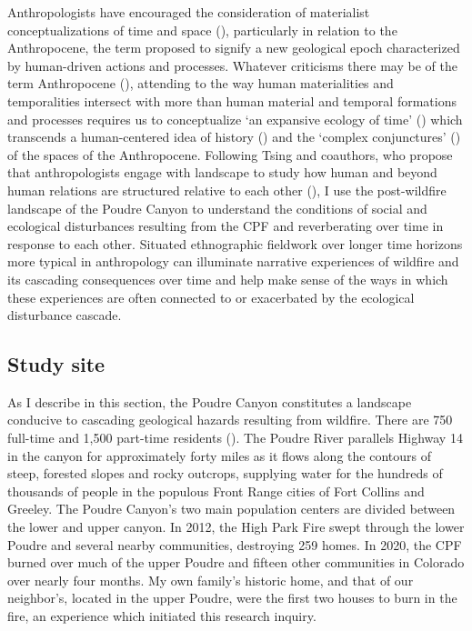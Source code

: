 \documentclass[
]{article}
\begin{document}
Anthropologists have encouraged the consideration of materialist conceptualizations of time and space (), particularly in relation to the Anthropocene, the term proposed to signify a new geological epoch characterized by human-driven actions and processes. Whatever criticisms there may be of the term Anthropocene (), attending to the way human materialities and temporalities intersect with more than human material and temporal formations and processes requires us to conceptualize `an expansive ecology of time' () which transcends a human-centered idea of history () and the `complex conjunctures' () of the spaces of the Anthropocene. Following Tsing and coauthors, who propose that anthropologists engage with landscape to study how human and beyond human relations are structured relative to each other (), I use the post-wildfire landscape of the Poudre Canyon to understand the conditions of social and ecological disturbances resulting from the CPF and reverberating over time in response to each other. Situated ethnographic fieldwork over longer time horizons more typical in anthropology can illuminate narrative experiences of wildfire and its cascading consequences over time and help make sense of the ways in which these experiences are often connected to or exacerbated by the ecological disturbance cascade.

\subsection{Study site}\label{study-site-1}

As I describe in this section, the Poudre Canyon constitutes a landscape conducive to cascading geological hazards resulting from wildfire. There are 750 full-time and 1,500 part-time residents (). The Poudre River parallels Highway 14 in the canyon for approximately forty miles as it flows along the contours of steep, forested slopes and rocky outcrops, supplying water for the hundreds of thousands of people in the populous Front Range cities of Fort Collins and Greeley. The Poudre Canyon's two main population centers are divided between the lower and upper canyon. In 2012, the High Park Fire swept through the lower Poudre and several nearby communities, destroying 259 homes. In 2020, the CPF burned over much of the upper Poudre and fifteen other communities in Colorado over nearly four months. My own family's historic home, and that of our neighbor's, located in the upper Poudre, were the first two houses to burn in the fire, an experience which initiated this research inquiry.
\end{document}

